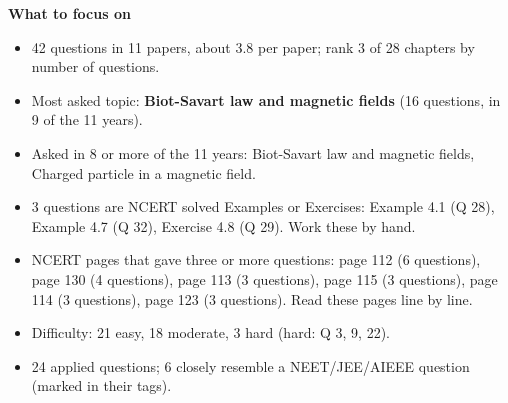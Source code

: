 \begin{minipage}[t]{0.63\linewidth}{\small\textbf{\color{crimson}What to focus on}\par\smallskip
\begin{itemize}[leftmargin=1.1em,itemsep=1pt,topsep=0pt]
\item 42 questions in 11 papers, about 3.8 per paper; rank 3 of 28 chapters by number of questions.
\item Most asked topic: \textbf{Biot-Savart law and magnetic fields} (16 questions, in 9 of the 11 years).
\item Asked in 8 or more of the 11 years: Biot-Savart law and magnetic fields, Charged particle in a magnetic field.
\item 3 questions are NCERT solved Examples or Exercises: Example 4.1 (Q 28), Example 4.7 (Q 32), Exercise 4.8 (Q 29). Work these by hand.
\item NCERT pages that gave three or more questions: page 112 (6 questions), page 130 (4 questions), page 113 (3 questions), page 115 (3 questions), page 114 (3 questions), page 123 (3 questions). Read these pages line by line.
\item Difficulty: 21 easy, 18 moderate, 3 hard (hard: Q 3, 9, 22).
\item 24 applied questions; 6 closely resemble a NEET/JEE/AIEEE question (marked in their tags).
\end{itemize}}\end{minipage}\par
{}
